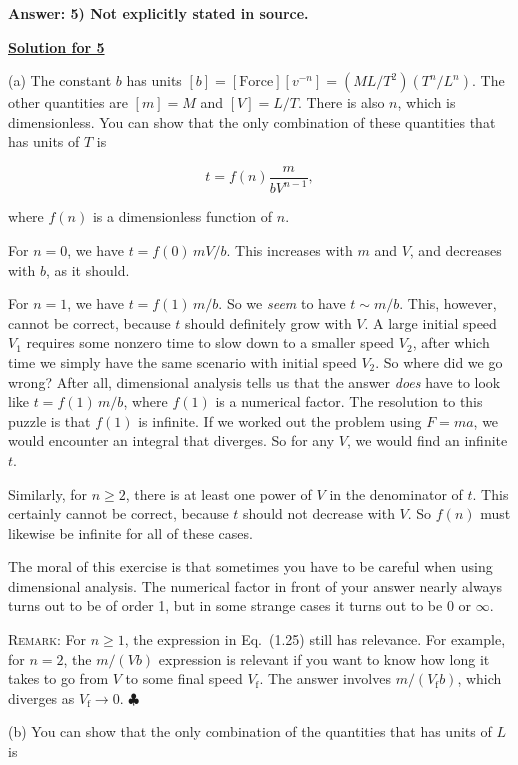 \textbf{Answer: 5) Not explicitly stated in source.}

\underline{\textbf{Solution for 5}}


(a) The constant $b$ has units $[b] = [\text{Force}][v^{-n}] = (ML/T^2)(T^n/L^n)$. The other quantities are $[m] = M$ and $[V] = L/T$. There is also $n$, which is dimensionless. You can show that the only combination of these quantities that has units of $T$ is

\begin{equation} t = f(n)\frac{m}{bV^{n-1}}, \tag{1.25} \end{equation}

where $f(n)$ is a dimensionless function of $n$.

For $n = 0$, we have $t = f(0)\, mV/b$. This increases with $m$ and $V$, and decreases with $b$, as it should.

For $n = 1$, we have $t = f(1)\, m/b$. So we \textit{seem} to have $t \sim m/b$. This, however, cannot be correct, because $t$ should definitely grow with $V$. A large initial speed $V_1$ requires some nonzero time to slow down to a smaller speed $V_2$, after which time we simply have the same scenario with initial speed $V_2$. So where did we go wrong? After all, dimensional analysis tells us that the answer \textit{does} have to look like $t = f(1)\, m/b$, where $f(1)$ is a numerical factor. The resolution to this puzzle is that $f(1)$ is infinite. If we worked out the problem using $F = ma$, we would encounter an integral that diverges. So for any $V$, we would find an infinite $t$.

Similarly, for $n \ge 2$, there is at least one power of $V$ in the denominator of $t$. This certainly cannot be correct, because $t$ should not decrease with $V$. So $f(n)$ must likewise be infinite for all of these cases.

The moral of this exercise is that sometimes you have to be careful when using dimensional analysis. The numerical factor in front of your answer nearly always turns out to be of order 1, but in some strange cases it turns out to be 0 or $\infty$.

\textsc{Remark:} For $n \ge 1$, the expression in Eq.\ (1.25) still has relevance. For example, for $n = 2$, the $m/(Vb)$ expression is relevant if you want to know how long it takes to go from $V$ to some final speed $V_{\text{f}}$. The answer involves $m/(V_{\text{f}}b)$, which diverges as $V_{\text{f}} \to 0$. $\clubsuit$

(b) You can show that the only combination of the quantities that has units of $L$ is

